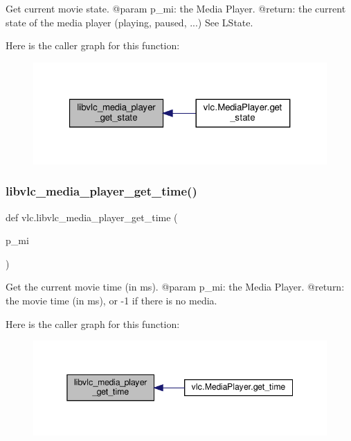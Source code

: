 \begin{DoxyVerb}Get current movie state.
@param p_mi: the Media Player.
@return: the current state of the media player (playing, paused, ...) See L{State}.
\end{DoxyVerb}
 Here is the caller graph for this function\+:
\nopagebreak
\begin{figure}[H]
\begin{center}
\leavevmode
\includegraphics[width=321pt]{namespacevlc_a60436fe75d714191a7df72db2c83e8b9_icgraph}
\end{center}
\end{figure}
\mbox{\label{namespacevlc_a63c5311e72fe1f8cb66ba3cf689bcdea}} 
\subsubsection{\texorpdfstring{libvlc\+\_\+media\+\_\+player\+\_\+get\+\_\+time()}{libvlc\_media\_player\_get\_time()}}
{\footnotesize\ttfamily def vlc.\+libvlc\+\_\+media\+\_\+player\+\_\+get\+\_\+time (\begin{DoxyParamCaption}\item[{}]{p\+\_\+mi }\end{DoxyParamCaption})}

\begin{DoxyVerb}Get the current movie time (in ms).
@param p_mi: the Media Player.
@return: the movie time (in ms), or -1 if there is no media.
\end{DoxyVerb}
 Here is the caller graph for this function\+:
\nopagebreak
\begin{figure}[H]
\begin{center}
\leavevmode
\includegraphics[width=345pt]{namespacevlc_a63c5311e72fe1f8cb66ba3cf689bcdea_icgraph}
\end{center}
\end{figure}
\mbox{\label{namespacevlc_af14b0c9e3e60e215a97f32ee65a5bb2d}} 
